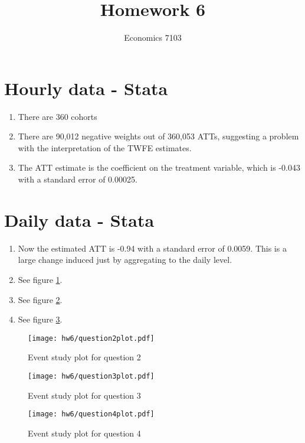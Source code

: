 \documentclass{article}
\title{Homework 6}
\author{Economics 7103}
\date{ }
\begin{document}
\maketitle

\section{Hourly data - Stata}

\begin{enumerate}
    \item There are 360 cohorts
    \item There are 90,012 negative weights out of 360,053 ATTs, suggesting a problem with the interpretation of the TWFE estimates.
    \item The ATT estimate is the coefficient on the treatment variable, which is -0.043 with a standard error of 0.00025.
\end{enumerate}

\section{Daily data - Stata}

\begin{enumerate}
    \item Now the estimated ATT is -0.94 with a standard error of 0.0059.  This is a large change induced just by aggregating to the daily level.
    \item See figure \ref{fig:hw6q2}.
    \item See figure \ref{fig:hw6q3}.
    \item See figure \ref{fig:hw6q4}.
\end{enumerate}

\begin{figure}
    \centering
    \texttt{[image: hw6/question2plot.pdf]}
    \caption{Event study plot for question 2}
    \label{fig:hw6q2}
\end{figure}

\begin{figure}
    \centering
    \texttt{[image: hw6/question3plot.pdf]}
    \caption{Event study plot for question 3}
    \label{fig:hw6q3}
\end{figure}

\begin{figure}
    \centering
    \texttt{[image: hw6/question4plot.pdf]}
    \caption{Event study plot for question 4}
    \label{fig:hw6q4}
\end{figure}
\end{document}
